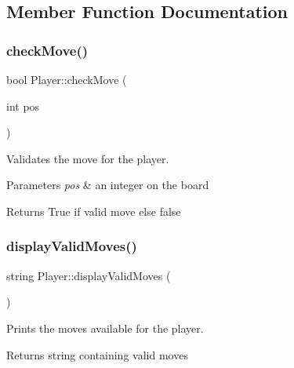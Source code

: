 \subsection{Member Function Documentation}
\mbox{\label{classPlayer_a304c0a31df5ccf7acbdb2a2381facbb5}} 
\subsubsection{\texorpdfstring{check\+Move()}{checkMove()}}
{\footnotesize\ttfamily bool Player\+::check\+Move (\begin{DoxyParamCaption}\item[{int}]{pos }\end{DoxyParamCaption})}



Validates the move for the player. 


\begin{DoxyParams}{Parameters}
{\em pos} & an integer on the board \\
\hline
\end{DoxyParams}
\begin{DoxyReturn}{Returns}
True if valid move else false 
\end{DoxyReturn}
\mbox{\label{classPlayer_a00b37112d7ee56c91a0219dcacaece68}} 
\subsubsection{\texorpdfstring{display\+Valid\+Moves()}{displayValidMoves()}}
{\footnotesize\ttfamily string Player\+::display\+Valid\+Moves (\begin{DoxyParamCaption}{ }\end{DoxyParamCaption})}



Prints the moves available for the player. 

\begin{DoxyReturn}{Returns}
string containing valid moves 
\end{DoxyReturn}
\mbox{\label{classPlayer_affad011a9ad4f41e3ee316bb0be47d10}} 
